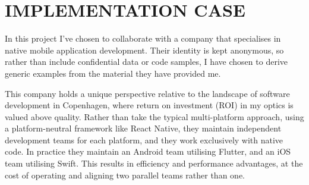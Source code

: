 \documentclass[../report.tex]{subfiles}
\begin{document}
\section{IMPLEMENTATION CASE} \label{sec:case}




In this project I've chosen to collaborate with a company that specialises in native mobile application development. Their identity is kept anonymous, so rather than include confidential data or code samples, I have chosen to derive generic examples from the material they have provided me.

This company holds a unique perspective relative to the landscape of software development in Copenhagen, where return on investment (ROI) in my optics is valued above quality. Rather than take the typical multi-platform approach, using a platform-neutral framework like React Native, they maintain independent development teams for each platform, and they work exclusively with native code. In practice they maintain an Android team utilising Flutter, and an iOS team utilising Swift. This results in efficiency and performance advantages, at the cost of operating and aligning two parallel teams rather than one.
\end{document}
